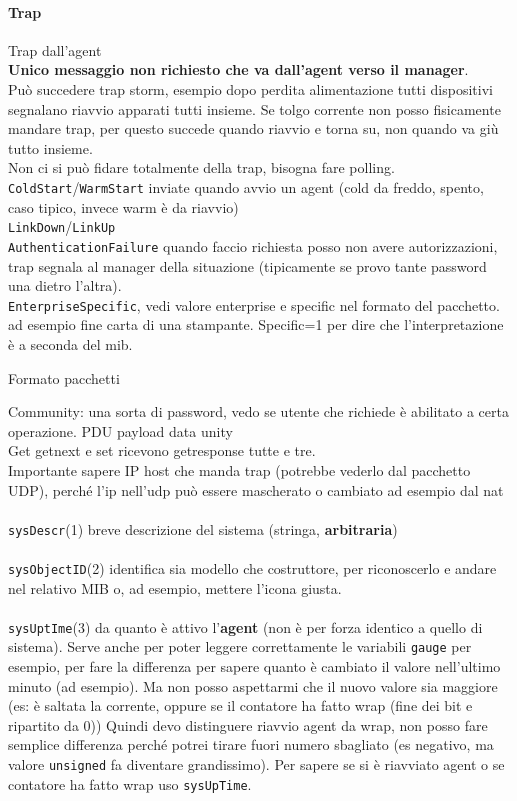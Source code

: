 \documentclass[10pt]{book}
\begin{document}
\paragraph{Trap} Trap dall'agent\\
\textbf{Unico messaggio non richiesto che va dall'agent verso il manager}.\\
Può succedere trap storm, esempio dopo perdita alimentazione tutti dispositivi segnalano riavvio apparati tutti insieme. Se tolgo corrente non posso fisicamente mandare trap, per questo succede quando riavvio e torna su, non quando va giù tutto insieme.\\
Non ci si può fidare totalmente della trap, bisogna fare polling.\\
\texttt{ColdStart}/\texttt{WarmStart} inviate quando avvio un agent (cold da freddo, spento, caso tipico, invece warm è da riavvio)\\
\texttt{LinkDown}/\texttt{LinkUp}\\
\texttt{AuthenticationFailure} quando faccio richiesta posso non avere autorizzazioni, trap segnala al manager della situazione (tipicamente se provo tante password una dietro l'altra).\\
\texttt{EnterpriseSpecific}, vedi valore enterprise e specific nel formato del pacchetto. ad esempio fine carta di una stampante. Specific=1 per dire che l'interpretazione è a seconda del mib.
\begin{center}
	Formato pacchetti
\end{center}
Community: una sorta di password, vedo se utente che richiede è abilitato a certa operazione. PDU payload data unity\\
Get getnext e set ricevono getresponse tutte e tre.\\
Importante sapere IP host che manda trap (potrebbe vederlo dal pacchetto UDP), perché l'ip nell'udp può essere mascherato o cambiato ad esempio dal nat\\\\
\texttt{sysDescr}(1) breve descrizione del sistema (stringa, \textbf{arbitraria})\\\\
\texttt{sysObjectID}(2) identifica sia modello che costruttore, per riconoscerlo e andare nel relativo MIB o, ad esempio, mettere l'icona giusta.\\\\
\texttt{sysUptIme}(3) da quanto è attivo l'\textbf{agent} (non è per forza identico a quello di sistema). Serve anche per poter leggere correttamente le variabili \texttt{gauge} per esempio, per fare la differenza per sapere quanto è cambiato il valore nell'ultimo minuto (ad esempio). Ma non posso aspettarmi che il nuovo valore sia maggiore (es: è saltata la corrente, oppure se il contatore ha fatto wrap (fine dei bit e ripartito da 0)) Quindi devo distinguere riavvio agent da wrap, non posso fare semplice differenza perché potrei tirare fuori numero sbagliato (es negativo, ma valore \texttt{unsigned} fa diventare grandissimo). Per sapere se si è riavviato agent o se contatore ha fatto wrap uso \texttt{sysUpTime}.\\\\
\end{document}
